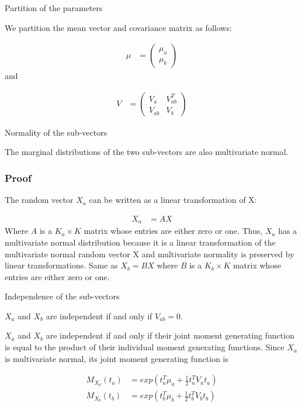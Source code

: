 Partition of the parameters

We partition the mean vector and covariance matrix as follows:

\begin{align*}
	\mu &= \begin{pmatrix}
		\mu_a \\
		\mu_b
	\end{pmatrix}
\end{align*}
and 

\begin{align*}
	V &= \begin{pmatrix}
		V_a & V_{ab}^T \\
		V_{ab} & V_b
	\end{pmatrix}
\end{align*}

Normality of the sub-vectors

The marginal distributions of the two sub-vectors are also multivariate normal.

\subsubsection{Proof}
The random vector $X_a$ can be written as a linear transformation of X:

\begin{align*}
	X_a &= A X
\end{align*}
Where $A$ is a $K_a \times K$ matrix whose entries are either zero or one. Thus, $X_a $ has a multivariate normal distribution because it is a linear transformation of the multivariate normal random vector X and multivariate normality is preserved by linear transformations. Same as $X_b = B X$ where $B$ is a $K_b \times K$ matrix whose entries are either zero or one. 



Independence of the sub-vectors

$X_a$ and $X_b$ are independent if and only if $V_{ab} = 0$.

$X_a$ and $X_b$ are independent if and only if their joint moment generating function is equal to the product of their individual moment generating functions. Since $X_a$ is multivariate normal, its joint moment generating function is 

\begin{align*}
	M_{X_a}(t_a) &= exp(t^T_a \mu_a + \frac{1}{2} t_a^T V_a t_a) \\
	M_{X_b}(t_b) &= exp(t^T_b \mu_b + \frac{1}{2} t_b^T V_b t_b) 
\end{align*}

